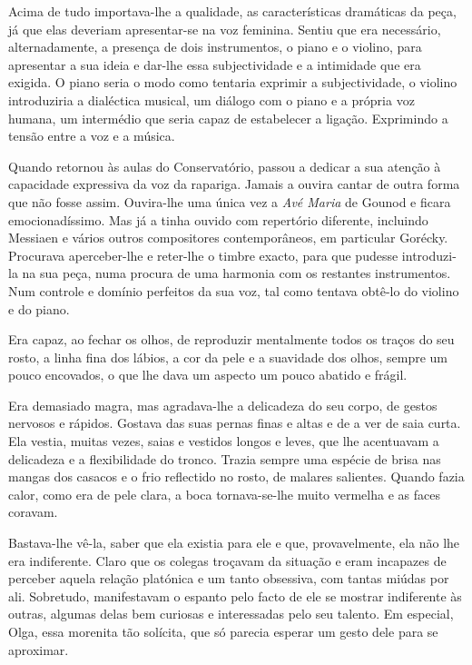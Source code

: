 Acima de tudo importava-lhe a qualidade, as características dramáticas
da peça, já que elas deveriam apresentar-se na voz feminina. Sentiu que
era necessário, alternadamente, a presença de dois instrumentos, o piano
e o violino, para apresentar a sua ideia e dar-lhe essa subjectividade e
a intimidade que era exigida. O piano seria o modo como tentaria
exprimir a subjectividade, o violino introduziria a dialéctica musical,
um diálogo com o piano e a própria voz humana, um intermédio que seria
capaz de estabelecer a ligação. Exprimindo a tensão entre a voz e a
música.

Quando retornou às aulas do Conservatório, passou a dedicar a sua
atenção à capacidade expressiva da voz da rapariga. Jamais a ouvira
cantar de outra forma que não fosse assim. Ouvira-lhe uma única vez a
\emph{Avé Maria} de Gounod e ficara emocionadíssimo. Mas já a tinha
ouvido com repertório diferente, incluindo Messiaen e vários outros
compositores contemporâneos, em particular Gorécky. Procurava
aperceber-lhe e reter-lhe o timbre exacto, para que pudesse introduzi-la
na sua peça, numa procura de uma harmonia com os restantes instrumentos.
Num controle e domínio perfeitos da sua voz, tal como tentava obtê-lo do
violino e do piano.

Era capaz, ao fechar os olhos, de reproduzir mentalmente todos os traços
do seu rosto, a linha fina dos lábios, a cor da pele e a suavidade dos
olhos, sempre um pouco encovados, o que lhe dava um aspecto um pouco
abatido e frágil.

Era demasiado magra, mas agradava-lhe a delicadeza do seu corpo, de
gestos nervosos e rápidos. Gostava das suas pernas finas e altas e de a
ver de saia curta. Ela vestia, muitas vezes, saias e vestidos longos e
leves, que lhe acentuavam a delicadeza e a flexibilidade do tronco.
Trazia sempre uma espécie de brisa nas mangas dos casacos e o frio
reflectido no rosto, de malares salientes. Quando fazia calor, como era
de pele clara, a boca tornava-se-lhe muito vermelha e as faces coravam.

Bastava-lhe vê-la, saber que ela existia para ele e que, provavelmente,
ela não lhe era indiferente. Claro que os colegas troçavam da situação e
eram incapazes de perceber aquela relação platónica e um tanto
obsessiva, com tantas miúdas por ali. Sobretudo, manifestavam o espanto
pelo facto de ele se mostrar indiferente às outras, algumas delas bem
curiosas e interessadas pelo seu talento. Em especial, Olga, essa
morenita tão solícita, que só parecia esperar um gesto dele para se
aproximar.

